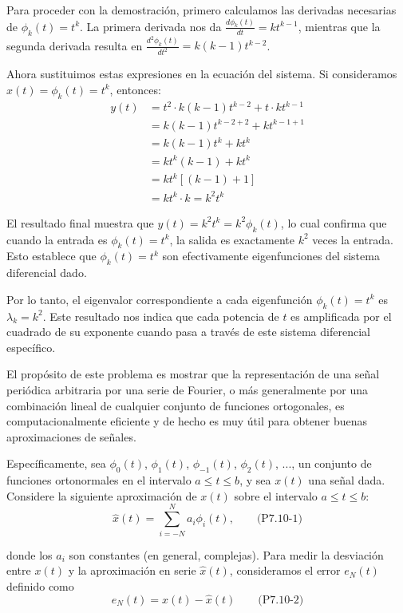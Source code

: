 \documentclass[
  11pt,
  letterpaper,
   addpoints,
   answers
  ]{exam}
\begin{document}
\begin{questions}
\begin{solution}
Para proceder con la demostración, primero calculamos las derivadas necesarias de $\phi_k(t) = t^k$. La primera derivada nos da $\frac{d\phi_k(t)}{dt} = kt^{k-1}$, mientras que la segunda derivada resulta en $\frac{d^2\phi_k(t)}{dt^2} = k(k-1)t^{k-2}$.

Ahora sustituimos estas expresiones en la ecuación del sistema. Si consideramos $x(t) = \phi_k(t) = t^k$, entonces:
\begin{align}
y(t) &= t^2 \cdot k(k-1)t^{k-2} + t \cdot kt^{k-1} \\
&= k(k-1)t^{k-2+2} + kt^{k-1+1} \\
&= k(k-1)t^k + kt^k \\
&= kt^k(k-1) + kt^k \\
&= kt^k[(k-1) + 1] \\
&= kt^k \cdot k = k^2t^k
\end{align}

El resultado final muestra que $y(t) = k^2t^k = k^2\phi_k(t)$, lo cual confirma que cuando la entrada es $\phi_k(t) = t^k$, la salida es exactamente $k^2$ veces la entrada. Esto establece que $\phi_k(t) = t^k$ son efectivamente eigenfunciones del sistema diferencial dado.

Por lo tanto, el eigenvalor correspondiente a cada eigenfunción $\phi_k(t) = t^k$ es $\boxed{\lambda_k = k^2}$. Este resultado nos indica que cada potencia de $t$ es amplificada por el cuadrado de su exponente cuando pasa a través de este sistema diferencial específico.
\end{solution}
\question 
El propósito de este problema es mostrar que la representación de una señal periódica arbitraria por una serie de Fourier, o más generalmente por una combinación lineal de cualquier conjunto de funciones ortogonales, es computacionalmente eficiente y de hecho es muy útil para obtener buenas aproximaciones de señales.

Específicamente, sea $\phi_0(t)$, $\phi_1(t)$, $\phi_{-1}(t)$, $\phi_2(t)$, ..., un conjunto de funciones ortonormales en el intervalo $a \leq t \leq b$, y sea $x(t)$ una señal dada. Considere la siguiente aproximación de $x(t)$ sobre el intervalo $a \leq t \leq b$:
$$\hat{x}(t) = \sum_{i=-N}^{N} a_i\phi_i(t), \qquad \text{(P7.10-1)}$$

donde los $a_i$ son constantes (en general, complejas). Para medir la desviación entre $x(t)$ y la aproximación en serie $\hat{x}(t)$, consideramos el error $e_N(t)$ definido como
$$e_N(t) = x(t) - \hat{x}(t) \qquad \text{(P7.10-2)}$$


\end{questions}
\end{document}
